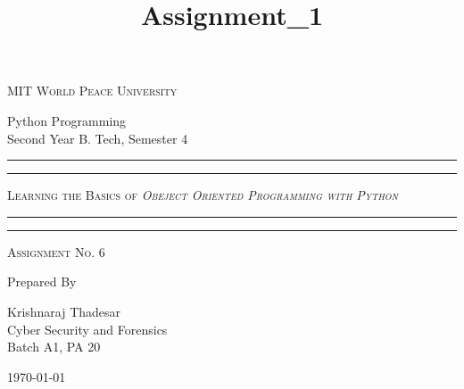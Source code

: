 \documentclass[11pt]{article}
\title{Assignment\_1}
\begin{document}
\begin{titlepage}
	\centering


	\huge\textsc{
		MIT World Peace University
	}\\

	\vspace{0.75\baselineskip} %

	\LARGE{
		Python Programming\\
		Second Year B. Tech, Semester 4
	}

	\vfill %


	\rule{\textwidth}{1.6pt}\vspace*{-\baselineskip}\vspace*{2pt}
	\rule{\textwidth}{0.6pt}
	\vspace{0.75\baselineskip} %



	\huge{\textsc{
		Learning the Basics of 
			\textit{Obeject Oriented Programming with Python}
		}} \\



	\vspace{0.5\baselineskip} %
	\rule{\textwidth}{0.6pt}\vspace*{-\baselineskip}\vspace*{2.8pt}
	\rule{\textwidth}{1.6pt}

	\vspace{1\baselineskip} %


	\LARGE\textsc{
		Assignment No. 6
	} %
	\vfill


	Prepared By
	\vspace{0.5\baselineskip} %

	\Large{
		Krishnaraj Thadesar \\
		Cyber Security and Forensics\\
		Batch A1, PA 20
	}


	\vspace{0.5\baselineskip} %
	\today

\end{titlepage}
\end{document}
